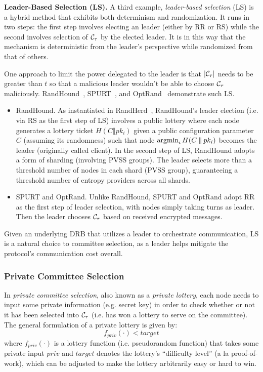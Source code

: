\noindent\textbf{Leader-Based Selection (LS).} A third example, \textit{leader-based selection} (LS) is a hybrid method that exhibits both determinism and randomization. It runs in two steps: the first step involves electing an \epoch leader (either by RR or RS) while the second involves selection of $\mathcal{C}_\tau$ by the elected leader. It is in this way that the mechanism is deterministic from the leader's perspective while randomized from that of others.

One approach to limit the power delegated to the leader is that $|\mathcal{C}_\tau|$ needs to be greater than $t$ so that a malicious leader wouldn't be able to choose $\mathcal{C}_\tau$ maliciously. RandHound~\cite{syta2017scalable}, SPURT~\cite{das2021spurt}, and OptRand~\cite{bhat2022optrand} demonstrate such LS.
\begin{itemize}
\item RandHound. As instantiated in RandHerd~\cite{syta2017scalable}, RandHound's leader election (i.e. via RS as the first step of LS) involves a public lottery where each node generates a lottery ticket $H(C \mathbin\Vert pk_i)$ given a public configuration parameter $C$ (assuming its randomness) such that node $\operatorname*{argmin}_{i} H(C \mathbin\Vert pk_i)$ becomes the leader (originally called client). In the second step of LS, RandHound adopts a form of sharding (involving PVSS groups). The leader selects more than a threshold number of nodes in each shard (PVSS group), guaranteeing a threshold number of entropy providers across all shards.
\item SPURT and OptRand. Unlike RandHound, SPURT and OptRand adopt RR as the first step of leader selection, with nodes simply taking turns as \epoch leader. Then the leader chooses $\mathcal{C}_\tau$ based on received encrypted messages.
\end{itemize}

Given an underlying DRB that utilizes a leader to orchestrate communication, LS is a natural choice to committee selection, as a leader helps mitigate the protocol's communication cost overall.

\subsubsection{Private Committee Selection}
\label{subsubsection:private-committee-selection}
In \textit{private committee selection}, also known as a \textit{private lottery}, each node needs to input some private information (e.g. secret key) in order to check whether or not it has been selected into $\mathcal{C}_\tau$ (i.e. has won a lottery to serve on the committee). The general formulation of a private lottery is given by:
\[
f_{priv}(\cdot) < target
\]
where $f_{priv}(\cdot)$ is a lottery function (i.e. pseudorandom function) that takes some private input $priv$ and $target$ denotes the lottery's ``difficulty level'' (a la proof-of-work), which can be adjusted to make the lottery arbitrarily easy or hard to win.

